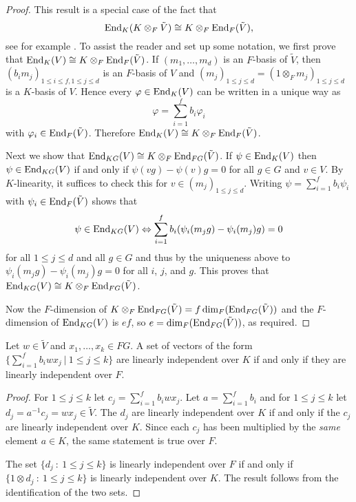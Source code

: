 \begin{proof}
This result is a special case of the fact that
\[\End_K(K \otimes_F \tilde{V}) \cong K \otimes_F
\End_F(\tilde{V}),\] see for
example \cite[(2.38)]{CRI}.
To assist the reader and set up some notation, we
 first prove that $\End_{K}(V) \cong K\otimes_{F} \End_{F}(\tilde{V})$. 
If $(m_1,\ldots,m_d)$ is an $F$-basis of $\tilde V$, then 
$(b_i m_j)_{1 \le i \le f, 1 \le j \le d}$ is an $F$-basis of $V$ and
$(m_j)_{1 \le j \le d} = (1 \otimes_F m_j)_{1 \le j \le d}$ is a
$K$-basis of $V$. Hence 
every $\varphi \in \End_K(V)$ can be written in a unique way as
\[ \varphi = \sum_{i=1}^f b_i \varphi_i \]
with $\varphi_i \in \End_F(\tilde V)$. Therefore
$\End_K(V) \cong K \otimes_F \End_F(\tilde V)$.

Next we show that $\End_{KG}(V) \cong K \otimes_F \End_{FG}(\tilde V)$. 
If $\psi \in \End_K(V)$ then $\psi \in \End_{KG}(V)$ if and only if
$\psi(vg) - \psi(v)g = 0$ for all $g \in G$ and  $v \in V$. By $K$-linearity, 
it suffices to check this for $v \in (m_j)_{1 \le j \le d}$. Writing
$\psi = \sum_{i=1}^f b_i \psi_i$ with $\psi_i \in \End_F(\tilde V)$ shows that
\[\psi \in \End_{KG}(V) \Leftrightarrow
 \sum_{i=1}^f b_i (\psi_i(m_jg)-\psi_i(m_j)g) = 0\]
for all $1 \le j \le d$ and all $g \in G$ and thus by the uniqueness 
above to $\psi_i(m_j g)-\psi_i(m_j)g=0$ for all $i$, $j$, and $g$. This
proves that $\End_{KG}(V) \cong K \otimes_{F} \End_{FG}(\tilde{V})$.

Now the $F$-dimension of $K\otimes_{F} \End_{FG}(\tilde{V}) = f
\dim_F(\End_{FG}(\tilde{V}))$ and the $F$-dimension of $\End_{KG}(V)$ is $e f$,
so $e = \dim_F(\End_{FG}(\tilde{V}))$, as required.
\end{proof}

\begin{Lemm}
\label{lindep}
Let $w \in \tilde{V}$ and $x_1, \ldots, x_k \in FG$. A set of vectors of the 
form $\{\sum_{i = 1}^f b_i w x_j \ | \ 1 \leq j \leq k\}$ are linearly
independent over $K$ if and only if they are linearly independent over
$F$.
\end{Lemm}

\begin{proof}
For $1 \leq j \leq k$ let $c_j = \sum_{i = 1}^f b_i w x_j$. Let $a =
\sum_{i = 1}^f b_i$ and for $1 \leq j \leq k$ let $d_j = a^{-1}c_j = w x_j
\in \tilde{V}$. The $d_j$ are linearly independent over $K$ if and only
if the $c_j$ are linearly independent over $K$. Since each $c_j$ has
been multiplied by the \emph{same} element $a \in K$, the same statement
is true over $F$.

The set $\{d_j \ : \ 1 \leq j \leq k\}$ is linearly independent over $F$
if and only if $\{1 \otimes d_j \ : \ 1 \leq j \leq k\}$ is linearly
independent over $K$. The
result follows from the identification of the two sets. 
\end{proof}


